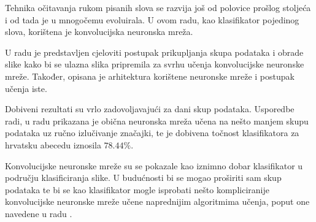 Tehnika očitavanja rukom pisanih slova se razvija još od polovice prošlog stoljeća i od tada je u mnogočemu evoluirala. U ovom radu, kao klasifikator pojedinog slova, korištena je konvolucijska neuronska mreža.

U radu je predstavljen cjeloviti postupak prikupljanja skupa podataka i obrade slike kako bi se ulazna slika pripremila za svrhu učenja konvolucijske neuronske mreže. Također, opisana je arhitektura korištene neuronske mreže i postupak učenja iste.

Dobiveni rezultati su vrlo zadovoljavajući za dani skup podataka. Usporedbe radi, u radu \citep{zavrsni} prikazana je obična neuronska mreža učena na nešto manjem skupu podataka uz ručno izlučivanje značajki, te je dobivena točnost klasifikatora za hrvatsku abecedu iznosila $78.44\%$.

Konvolucijske neuronske mreže su se pokazale kao iznimno dobar klasifikator u području klasificiranja slike. U budućnosti bi se mogao proširiti sam skup podataka te bi se kao klasifikator mogle isprobati nešto kompliciranije konvolucijske neuronske mreže učene naprednijim algoritmima učenja, poput one navedene u radu \citep{lenet5hecr}.
